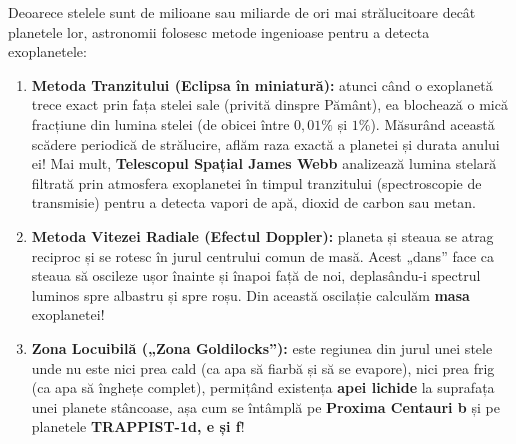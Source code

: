 \begin{tcolorbox}[orbitardata, title={\textbf{Cum găsim o planetă ascunsă în strălucirea unei stele îndepărtate?}}]
Deoarece stelele sunt de milioane sau miliarde de ori mai strălucitoare decât planetele lor, astronomii folosesc metode ingenioase pentru a detecta exoplanetele:
\begin{enumerate}[leftmargin=1.5em, itemsep=3pt]
  \item \textbf{Metoda Tranzitului (Eclipsa în miniatură):} atunci când o exoplanetă trece exact prin fața stelei sale (privită dinspre Pământ), ea blochează o mică fracțiune din lumina stelei (de obicei între $0{,}01\%$ și $1\%$). Măsurând această scădere periodică de strălucire, aflăm raza exactă a planetei și durata anului ei! Mai mult, \textbf{Telescopul Spațial James Webb} analizează lumina stelară filtrată prin atmosfera exoplanetei în timpul tranzitului (spectroscopie de transmisie) pentru a detecta vapori de apă, dioxid de carbon sau metan.
  \item \textbf{Metoda Vitezei Radiale (Efectul Doppler):} planeta și steaua se atrag reciproc și se rotesc în jurul centrului comun de masă. Acest „dans” face ca steaua să oscileze ușor înainte și înapoi față de noi, deplasându-i spectrul luminos spre albastru și spre roșu. Din această oscilație calculăm \textbf{masa} exoplanetei!
  \item \textbf{Zona Locuibilă („Zona Goldilocks”):} este regiunea din jurul unei stele unde nu este nici prea cald (ca apa să fiarbă și să se evapore), nici prea frig (ca apa să înghețe complet), permițând existența \textbf{apei lichide} la suprafața unei planete stâncoase, așa cum se întâmplă pe \textbf{Proxima Centauri b} și pe planetele \textbf{TRAPPIST-1d, e și f}!
\end{enumerate}
\end{tcolorbox}

